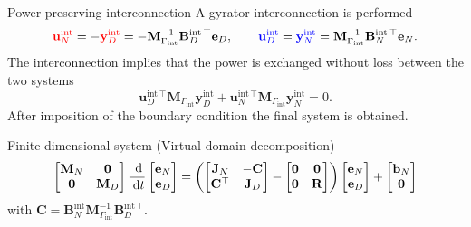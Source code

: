 \documentclass[aspectratio=169]{ISAE-Beamer}
\begin{document}
\begin{frame}{Power preserving interconnection}
A gyrator interconnection is performed
\begin{equation*}
\textcolor{red}{\mathbf{u}_N^{\text{int}}} = - \textcolor{red}{{\mathbf{y}}_D^{\text{int}}} = - \mathbf{M}_{\Gamma_{\text{int}}}^{-1}\mathbf{B}_{D}^{\text{int}\, \top} \mathbf{e}_D, \qquad
\textcolor{blue}{\mathbf{u}_D^{\text{int}}} = \textcolor{blue}{\mathbf{y}_N^{\text{int}}} = \mathbf{M}_{\Gamma_{\text{int}}}^{-1} \mathbf{B}_{N}^{\text{int}\, \top} \mathbf{e}_N.
\end{equation*}
The interconnection implies that the power is exchanged without loss between the two systems
\begin{equation*}
\mathbf{u}_D^{\text{int}\, \top} \mathbf{M}_{\Gamma_{\text{int}}} \mathbf{y}_D^{\text{int}} + \mathbf{u}_N^{\text{int}\, \top} \mathbf{M}_{\Gamma_{\text{int}}} \mathbf{y}_N^{\text{int}} = 0.
\end{equation*}
After imposition of the boundary condition the final system is obtained.
\begin{block}{Finite dimensional system (Virtual domain decomposition)}
	\begin{equation*}
\begin{bmatrix}
\mathbf{M}_N & \mathbf{0} \\
\mathbf{0} & \mathbf{M}_D \\
\end{bmatrix} \frac{\d}{\d t}
\begin{bmatrix}
\mathbf{e}_N\\
\mathbf{e}_D \\
\end{bmatrix}
= \left(\begin{bmatrix}
\mathbf{J}_N & -\mathbf{C} \\
\mathbf{C}^\top & \mathbf{J}_D \\
\end{bmatrix} - 
\begin{bmatrix}
\mathbf{0} & \mathbf{0} \\
\mathbf{0} & \mathbf{R} \\
\end{bmatrix}
 \right)
\begin{bmatrix}
\mathbf{e}_N\\
\mathbf{e}_D \\
\end{bmatrix}  + \begin{bmatrix}
\mathbf{b}_N \\
\mathbf{0} \\
\end{bmatrix}
	\end{equation*}
	with $\mathbf{C} = \mathbf{B}_{N}^{\text{int}} \mathbf{M}_{\Gamma_{\text{int}}}^{-1} \mathbf{B}_{D}^{\text{int}\, \top}$. 
\end{block}
\end{frame}
\end{document}
